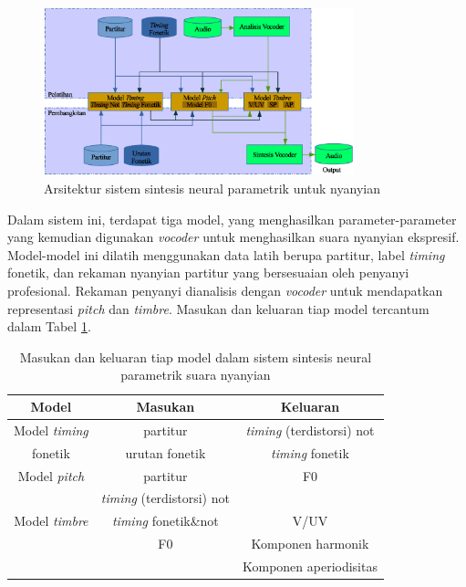\begin{figure}[h]
    \centering
    \includegraphics[width=0.8\textwidth]{resources/system-overview-bonada.eps}
    \caption{Arsitektur sistem sintesis neural parametrik untuk nyanyian \parencite{bonada2017singing}}\label{fig-system-overview-bonada}
\end{figure}

Dalam sistem ini, terdapat tiga model, yang menghasilkan parameter-parameter yang kemudian digunakan \textit{vocoder} untuk menghasilkan suara nyanyian ekspresif. Model-model ini dilatih menggunakan data latih berupa partitur, label \textit{timing} fonetik, dan rekaman nyanyian partitur yang bersesuaian oleh penyanyi profesional. Rekaman penyanyi dianalisis dengan \textit{vocoder} untuk mendapatkan representasi \textit{pitch} dan \textit{timbre}. Masukan dan keluaran tiap model tercantum dalam Tabel \ref{tab-models-in-out-bonada}. \parencite{bonada2017singing}

\begin{table}[h]
	\centering
    \caption{Masukan dan keluaran tiap model dalam sistem sintesis neural parametrik suara nyanyian \parencite{bonada2017singing}}\label{tab-models-in-out-bonada}
	\begin{tabular}{ |c|c|c| } 
	 \hline
	 Model & Masukan & Keluaran \\
	 \hline 
	 Model \textit{timing} & partitur & \textit{timing} (terdistorsi) not \\ 
	 fonetik  & urutan fonetik & \textit{timing} fonetik \\ 
	 \hline
	 Model \textit{pitch} & partitur & F0 \\ 
	  & \textit{timing} (terdistorsi) not  & \\ 
	 \hline
	 Model \textit{timbre} &  \textit{timing} fonetik\&not & V/UV \\ 
	  & F0 & Komponen harmonik\\ 
	  &   & Komponen aperiodisitas\\ 
	 \hline
	\end{tabular}
\end{table}

